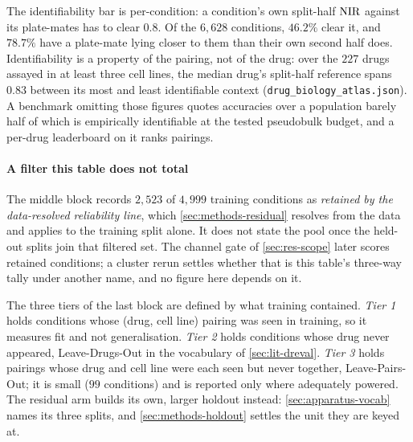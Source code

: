 The identifiability bar is per-condition: a condition's own split-half $\textrm{NIR}$
against its plate-mates has to clear $0.8$. Of the $6{,}628$ conditions,
$46.2\%$ clear it, and $78.7\%$ have a plate-mate lying closer to them than
their own second half does. Identifiability is a property of the pairing, not of
the drug: over the $227$ drugs assayed in at least three cell lines, the median
drug's split-half reference spans $0.83$ between its most and least identifiable
context (\texttt{drug\_biology\_atlas.json}). A benchmark omitting those figures
quotes accuracies over a population barely half of which is empirically
identifiable at the tested pseudobulk budget, and a per-drug leaderboard on it
ranks pairings.

\paragraph{A filter this table does not total} The middle block records
$2{,}523$ of $4{,}999$ training conditions as \emph{retained by the
data-resolved reliability line}, which
\cref{sec:methods-residual} resolves from the data and applies to the training
split alone. It does not state the pool
once the held-out splits join that filtered set. The channel gate of
\cref{sec:res-scope} later scores 
retained conditions; a cluster rerun settles whether that is this table's
three-way tally under another name, and no figure here depends on it.

The three tiers of the last block are defined by what training contained.
\emph{Tier 1} holds conditions whose (drug, cell line) pairing was
seen in training, so it measures fit and not generalisation. \emph{Tier 2} holds
conditions whose drug never appeared, Leave-Drugs-Out in the vocabulary of
\cref{sec:lit-dreval}. \emph{Tier 3} holds pairings whose drug and cell line
were each seen but never together, Leave-Pairs-Out; it is small ($99$
conditions) and is reported only where adequately powered. The residual arm
builds its own, larger holdout instead: \cref{sec:apparatus-vocab} names its
three splits, and \cref{sec:methods-holdout} settles the unit they are keyed
at.

